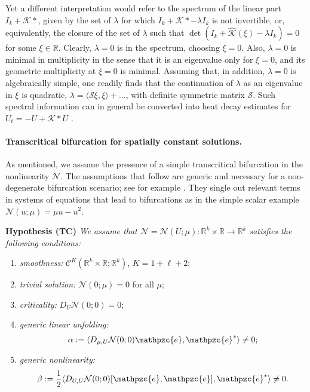 \documentclass[10pt]{article}
\newenvironment{Hypothesis}[1]%
  {\begin{trivlist}\item[]{\bf Hypothesis #1 }\em}{\end{trivlist}}
\newcommand{\R}{\mathbb{R}}
\newcommand{\Nl}{\mathcal{N}}
\newcommand{\K}{\mathcal{K}}
\newcommand{\e}{\mathpzc{e}}
\begin{document}
%
Yet a different interpretation would refer to the spectrum of the linear part $I_k + \K*$, given by the set of $\lambda$ for which $I_k + \K*-\lambda I_k$ is not invertible, or, equivalently, the  closure of the set of $\lambda$ such that $\det(I_k+\widehat{\K}(\xi)-\lambda I_k)= 0$ for some $\xi\in\R$. Clearly, $\lambda=0$ is in the spectrum, choosing $\xi=0$. Also, $\lambda=0$ is minimal in multiplicity in the sense that it is an eigenvalue only for $\xi=0$, and its geometric multiplicity at $\xi=0$ is minimal. Assuming that, in addition, $\lambda=0$ is algebraically simple, one readily finds that the continuation of $\lambda$ as an eigenvalue in $\xi$ is quadratic, $\lambda= \langle \mathcal{S}\xi,\xi\rangle+\ldots$, with definite symmetric matrix  $\mathcal{S}$. Such spectral information can in general be converted into heat decay estimates for $U_t=-U+\K*U$ \cite{heatnl}.


\paragraph{Transcritical bifurcation for spatially constant solutions.}
As mentioned, we assume the presence of a simple transcritical bifurcation in the nonlinearity $\Nl$. The assumptions that follow are generic and necessary for a non-degenerate bifurcation scenario; see for example \cite{chowhale}.  They single out relevant terms in systems of equations that lead to bifurcations as in the simple scalar example $\Nl(u;\mu)=\mu u - u^2$. 
 
\begin{Hypothesis} {(TC)} We assume that $\Nl=\Nl(U;\mu):\R^k \times \R \to \R^k $ satisfies the following conditions:
\begin{enumerate}
\item 
\emph{smoothness: }
$\mathscr{C}^{K}(\R^k \times \R; \R^k)$, $K=1+\ell+2$;
\item \emph{trivial solution: } $\Nl(0;\mu) = 0$ for all $\mu$;
\item \emph{criticality:} $D_U\Nl(0;0)=0$;
\item \emph{generic linear unfolding:  }
\begin{equation}
\alpha := \langle D_{\mu,U} \Nl(0;0){\e}, {\e}^*\rangle \neq 0; \label{muvCoe}\end{equation}
\item \emph{generic nonlinearity: } 
\begin{equation}
\beta := \frac{1}{2}\langle D_{U,U} \Nl(0;0)[{\e},{\e}], {\e}^*\rangle \neq 0.  \label{QuadCoe}
\end{equation}
\end{enumerate}
\end{Hypothesis}
\end{document}
